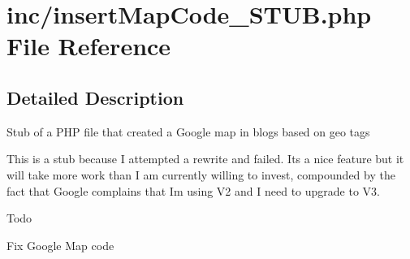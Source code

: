 \section{inc/insert\+Map\+Code\+\_\+\+S\+T\+UB.php File Reference}
\label{insert_map_code___s_t_u_b_8php}


\subsection{Detailed Description}
Stub of a P\+HP file that created a Google map in blogs based on geo tags

This is a stub because I attempted a rewrite and failed. It\textquotesingle{}s a nice feature but it will take more work than I am currently willing to invest, compounded by the fact that Google complains that I\textquotesingle{}m using V2 and I need to upgrade to V3.

\begin{DoxyRefDesc}{Todo}
\item[{\bf Todo}]Fix Google Map code \end{DoxyRefDesc}

